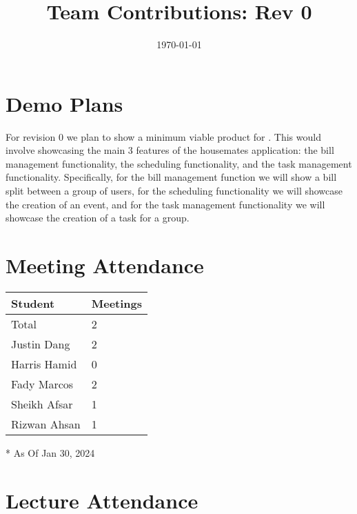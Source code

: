 \documentclass{article}
\title{Team Contributions: Rev 0\\\progname}
\author{\authname}
\date{\today}
\begin{document}
\maketitle

\section{Demo Plans}

For revision 0  we plan to show a minimum viable product for \progname. This would involve showcasing the main 3 features of the housemates application: the bill management functionality, the scheduling functionality, and the task management functionality. Specifically, for the bill management function we will show a bill split between a group of users, for the scheduling functionality we will showcase the creation of an event, and for the task management functionality we will showcase the creation of a task for a group.


\section{Meeting Attendance}


\begin{table}[H]
\centering
\begin{tabular}{ll}
\toprule
\textbf{Student} & \textbf{Meetings}\\
\midrule
Total & 2\\
Justin Dang & 2\\
Harris Hamid & 0\\
Fady Marcos & 2\\
Sheikh Afsar & 1\\
Rizwan Ahsan & 1\\
\bottomrule
\end{tabular}
\end{table}

* As Of Jan 30, 2024

\section{Lecture Attendance}
\end{document}
